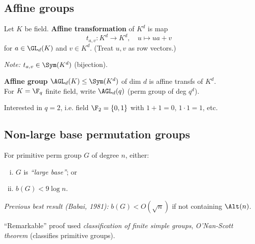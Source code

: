 \subsection{Affine groups}

\begin{slide}
    \begin{definition}
        \vspace{0pt}
        Let $K$ be field. \textbf{Affine transformation} of $K^d$ is map
        $$t_{a,v} : K^d \to K^d, \quad u \mapsto ua + v$$
        for $a \in \GL_d(K)$ and $v \in K^d$. (Treat $u,v$ as row vectors.)
    \end{definition} \pause

    \textit{Note:} $t_{a,v} \in \Sym(K^d)$ (bijection). \pause

    \begin{definition}
        \vspace{0pt}
        \textbf{Affine group} $\AGL_d(K) \leq \Sym(K^d)$ of dim $d$ is affine transfs of $K^d$. \\
        For $K = \F_q$ finite field, write $\AGL_d(q)$ (perm group of deg $q^d$).
    \end{definition} \pause

    Interested in $q = 2$, i.e. field $\F_2 = \{0,1\}$ with $1 + 1 = 0$, $1 \cdot 1 = 1$, etc.
\end{slide}

\subsection{Non-large base permutation groups}

\begin{slide}

    \begin{theorem}[Liebeck, 1984]
        \vspace{0pt}
        For primitive perm group $G$ of degree $n$, either:
        \begin{enumerate}[(i)]
            \item $G$ is \textit{``large base''}; or
            \item $b(G) < 9\log n$.
        \end{enumerate}
    \end{theorem} \pause

    \textit{Previous best result (Babai, 1981):} $b(G) < O(\sqrt{n})$ if not containing $\Alt(n)$.

    ``Remarkable'' proof used \textit{classification of finite simple groups}, \textit{O'Nan-Scott theorem} (classifies primitive groups).
\end{slide}

